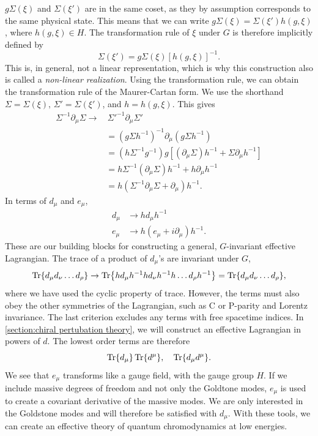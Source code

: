 $g\Sigma(\xi)$ and $\Sigma(\xi')$ are in the same coset, as they by assumption corresponds to the same physical state.
This means that we can write $g\Sigma(\xi) = \Sigma(\xi') h(g, \xi)$, where $h(g, \xi) \in H$.
The transformation rule of $\xi$ under $G$ is therefore implicitly defined by
\begin{equation}
    \Sigma(\xi') = g \Sigma(\xi) [h(g, \xi)]^{-1}.
\end{equation}
This is, in general, not a linear representation, which is why this construction also is called a \emph{non-linear realization}.
Using the transformation rule, we can obtain the transformation rule of the Maurer-Cartan form.
We use the shorthand $\Sigma = \Sigma(\xi),\, \Sigma' = \Sigma(\xi')$, and $h = h(g, \xi)$.
This gives
\begin{align*}
    \Sigma^{-1} \partial_\mu \Sigma
    \rightarrow 
    & \, \Sigma'^{-1} \partial_\mu \Sigma' \\
    & = (g \Sigma h^{-1})^{-1} \partial_\mu (g \Sigma h^{-1}) \\
    & = (h \Sigma^{-1} g^{-1}) g [(\partial_\mu \Sigma)h^{-1} + \Sigma \partial_\mu h^{-1}] \\
    & = h \Sigma^{-1} (\partial_\mu \Sigma) h^{-1}
    + h \partial_\mu h^{-1} \\
    & = h (\Sigma^{-1} \partial_\mu \Sigma + \partial_\mu) h^{-1}.
\end{align*}
In terms of $d_\mu$ and $e_\mu$,
\begin{align}
    d_\mu & \rightarrow h d_\mu h^{-1} \\
    e_\mu & \rightarrow h (e_\mu + i\partial_\mu )h^{-1}.
\end{align}
These are our building blocks for constructing a general, $G$-invariant effective Lagrangian.
The trace of a product of $d_\mu$'s are invariant under $G$,
\begin{equation}
    \Tr{d_\mu d_\nu \dots d_\rho} 
    \rightarrow
    \Tr{h d_\mu h^{-1} h d_\nu h^{-1} h \dots d_\rho h^{-1}}
    = \Tr{d_\mu d_\nu \dots d_\rho},
\end{equation}
where we have used the cyclic property of trace.
However, the terms must also obey the other symmetries of the Lagrangian, such as C or P-parity and Lorentz invariance.
The last criterion excludes any terms with free spacetime indices.
In \autoref{section:chiral pertubation theory}, we will construct an effective Lagrangian in powers of $d$.
The lowest order terms are therefore
\begin{equation}
    \label{first order terms CCWZ}
    \Tr{d_\mu} \Tr{d^\mu}, 
    \quad 
    \Tr{d_\mu d^\mu}.
\end{equation}
We see that $e_\mu$ transforms like a gauge field, with the gauge group $H$.
If we include massive degrees of freedom and not only the Goldtone modes, $e_\mu$ is used to create a covariant derivative of the massive modes.
We are only interested in the Goldstone modes and will therefore be satisfied with $d_\mu$.
With these tools, we can create an effective theory of quantum chromodynamics at low energies.


